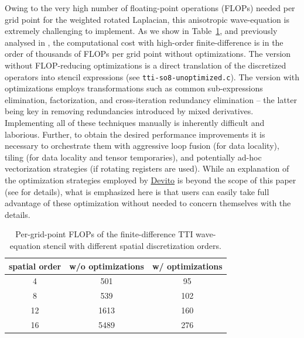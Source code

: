 \documentclass[conference]{IEEEtran}
\begin{document}
Owing to the very high number of floating-point operations (FLOPs) needed per
grid point for the weighted rotated Laplacian, this anisotropic wave-equation
is extremely challenging to implement. As we show in Table~\ref{ttiFLOPs}, and
previously analysed in \cite{louboutin2016ppf}, the computational cost with
high-order finite-difference is in the order of thousands of FLOPs per grid
point without optimizations. The version without FLOP-reducing optimizations is
a direct translation of the discretized operators into stencil expressions (see
\texttt{tti-so8-unoptimized.c}). The version with optimizations employs
transformations such as common sub-expressions elimination, factorization, and
cross-iteration redundancy elimination -- the latter being key in removing
redundancies introduced by mixed derivatives. Implementing all of these
techniques manually is inherently difficult and laborious. Further, to obtain
the desired performance improvements it is necessary to orchestrate them with
aggressive loop fusion (for data locality), tiling (for data locality and
tensor temporaries), and potentially ad-hoc vectorization strategies (if
rotating registers are used). While an explanation of the optimization
strategies employed by \href{https://github.com/devitocodes/devito}{Devito} is beyond the scope of this paper (see
\cite{devito-compiler} for details), what is emphasized here is that users
can easily take full advantage of these optimization without needed to
concern themselves with the details.

\begin{table}
\centering
\begin{tabular}{ccc}
\toprule\addlinespace
spatial order & w/o optimizations & w/ optimizations\tabularnewline
\midrule
4 & 501 & 95\tabularnewline
8 & 539 & 102\tabularnewline
12 & 1613 & 160\tabularnewline
16 & 5489 & 276\tabularnewline
\bottomrule
\end{tabular}
\caption{Per-grid-point FLOPs of the finite-difference TTI wave-equation stencil
with different spatial discretization orders.}\label{ttiFLOPs}
\end{table}
\end{document}
